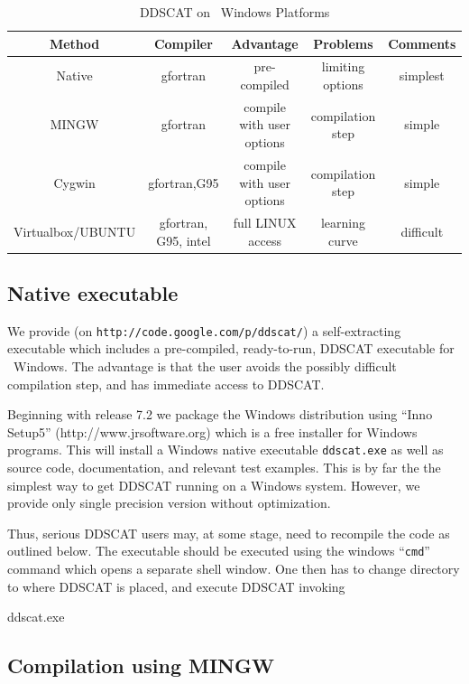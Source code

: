 \begin{table}[h]
\begin{center}
\caption{\label{tab:DDSCAT_on_windows}
         DDSCAT on \Microsoft\ Windows Platforms}
{\footnotesize
\begin{tabular}{|c|c|c|c|c|}
\hline 
Method & Compiler & Advantage & Problems & Comments\tabularnewline
\hline 
\hline 
Native & gfortran & pre-compiled & limiting options & simplest\tabularnewline
\hline 
MINGW & gfortran & compile with user options & compilation step & simple\tabularnewline
\hline 
Cygwin & gfortran,G95 & compile with user options & compilation step & simple\tabularnewline
\hline 
Virtualbox/UBUNTU & gfortran, G95, intel & full LINUX access & learning curve & difficult\tabularnewline
\hline 
\end{tabular}
}
\end{center}
\end{table}

\subsection{\label{sec:native executable}
            Native executable}

We provide (on {\tt http://code.google.com/p/ddscat/}) 
a self-extracting executable which includes a pre-compiled, 
ready-to-run,
DDSCAT executable for \Microsoft\ Windows. 
The advantage is that the user avoids the
possibly difficult compilation
step, and has immediate access to DDSCAT. 

Beginning with release 7.2 we package the Windows distribution using
{}``Inno Setup5'' (http://www.jrsoftware.org) which is a free
installer for Windows programs.  This will install a Windows native
executable {\tt ddscat.exe} as well as source code, documentation, and
relevant test examples. This is by far the the simplest way to get
DDSCAT running on a Windows system. However, we provide only single
precision version without optimization.

Thus, serious DDSCAT
users may, at some stage, need to recompile the code as outlined below.
The executable should be executed using the windows ``{\tt cmd}'' command
which opens a separate shell window. One then has to change directory to
where DDSCAT is placed, and execute DDSCAT invoking

\medskip

\indent\indent ddscat.exe


\subsection{Compilation using MINGW}

